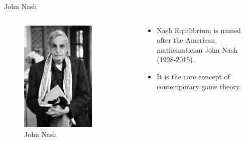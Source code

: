 \documentclass[
  14pt,
  letterpaper,
  ignorenonframetext,
  aspectratio=169,
  handout]{beamer}
\providecommand{\tightlist}{%
  \setlength{\itemsep}{0pt}\setlength{\parskip}{0pt}}\usepackage{longtable,booktabs,array}
\let\olditem\item
\renewcommand{\item}{%
\olditem\vspace{6pt}}
\begin{document}
\begin{frame}{John Nash}
\protect\hypertarget{john-nash-1}{}
\begin{columns}[c]
\begin{column}{0.48\textwidth}
\begin{figure}

{\centering \includegraphics[width=0.75\textwidth,height=0.75\textheight]{images/nash.jpg}

}

\caption{John Nash}

\end{figure}
\end{column}

\begin{column}{0.48\textwidth}
\begin{itemize}[<+->]
\tightlist
\item
  Nash Equilibrium is named after the American mathematician John Nash
  (1928-2015).
\item
  It is the core concept of contemporary game theory.
\end{itemize}
\end{column}
\end{columns}
\end{frame}
\end{document}
